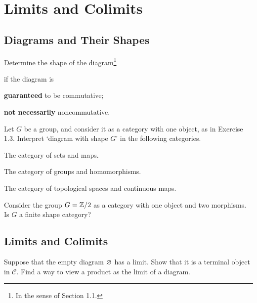 \chapter{Limits and Colimits}

\section{Diagrams and Their Shapes}

\bx
Determine the shape of the diagram\footnote{In the sense of Section 1.1.}
\bse
{}
\ese
if the diagram is
\ben[label=(\alph*)]
\item \textbf{guaranteed} to be commutative;
\item \textbf{not necessarily} noncommutative.
\een 
\ex

\bs
\ben[label=(\alph*)]
\item  
\item 
\een
\es

\bx
Let $G$ be a group, and consider it as a category with one object, as in Exercise 1.3. Interpret `diagram with shape $G$' in the following categories.
\ben[label=(\alph*)]
\item  The category of sets and maps.
\item The category of groups and homomorphisms.
\item The category of topological spaces and continuous maps.
\een
\ex

\bs
\ben[label=(\alph*)]
\item  
\item
\item 
\een
\es

\bx
Consider the group $G = \mathbb{Z}/2$ as a category with one object and two morphisms. Is $G$ a finite shape category?
\ex

\bs
\es

\section{Limits and Colimits}

\bx
Suppose that the empty diagram $\varnothing$ has a limit. Show that it is a terminal object in $\mathcal{C}$. Find a way to view a product as the limit of a diagram.
\ex

\bs
\es

